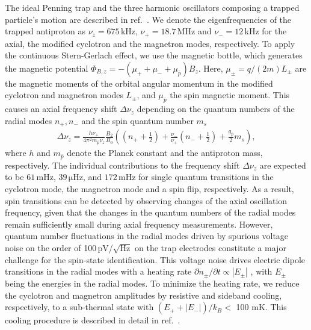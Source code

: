 \documentclass[preprint%
]{elsarticle}
\begin{document}
The ideal Penning trap and the three harmonic oscillators composing a trapped particle's motion are described in ref.~\cite{Brown}. We denote the eigenfrequencies of the trapped antiproton as $\nu_z = 675\,$kHz, $\nu_+ = 18.7\,$MHz and $\nu_- = 12\,$kHz for the axial, the modified cyclotron and the magnetron modes, respectively.
To apply the continuous Stern-Gerlach effect, we use the magnetic bottle, which generates the magnetic potential $\Phi_{B,z} = - (\mu_+ + \mu_- + \mu_{\overline{p}}) B_z$. Here, $\mu_\pm = q/(2 m) L_{\pm}$ are the magnetic moments of the orbital angular momentum in the modified cyclotron and magnetron modes $L_{\pm}$, and $\mu_{\overline{p}}$ the spin magnetic moment. This causes an axial frequency shift $\Delta\nu_z$ depending on the quantum numbers of the radial modes $n_+, n_-$ and the spin quantum number $m_s$
\begin{eqnarray}
\Delta\nu_z = \frac{h \nu_+}{4 \pi^2 m_{\overline{p}} \nu_z} \frac{B_2}{B_0} %
\left( 
\left(n_+ + \frac{1}{2}\right) + 
\frac{\nu_-}{\nu_+}\left(n_- + \frac{1}{2}\right)+\frac{g_{\overline{p}}}{2}m_s \right),
\end{eqnarray}
where $h$ and $m_{\overline{p}}$ denote the Planck constant and the antiproton mass, respectively. The individual contributions to the frequency shift $\Delta\nu_z$ are expected to be $61\,$mHz, $39\,\mathrm{\mu}$Hz, and $172\,$mHz for single quantum transitions in the cyclotron mode, the magnetron mode and a spin flip, respectively. As a  result, spin transitions can be detected by observing changes of the axial oscillation frequency, given that the changes in the quantum numbers of the radial modes remain sufficiently small during axial frequency measurements. However, quantum number fluctuations in the radial modes driven by spurious voltage noise on the order of 100$\,$pV/$\sqrt{\mathrm{Hz}}$ on the trap electrodes constitute a major challenge for the spin-state identification. This voltage noise drives electric dipole transitions in the radial modes with a heating rate $\partial n_\pm/\partial t \propto |E_\pm|$ \cite{MooserPLB2013}, with $E_\pm$ being the energies in the radial modes. To minimize the heating rate, we reduce the cyclotron and magnetron amplitudes by resistive and sideband cooling, respectively, to a sub-thermal state with $(E_+ + |E_-|)/k_B <$ 100 mK. 
This cooling procedure is described in detail in ref.~\cite{MooserPLB2013}. 
\end{document}
